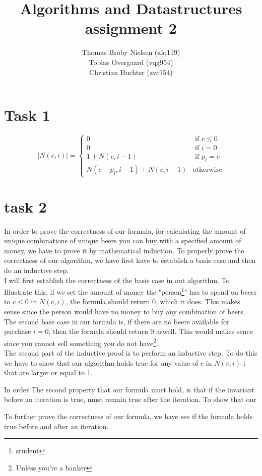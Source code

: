 \documentclass[12pt]{article}
\title{Algorithms and Datastructures assignment 2}
\author{Thomas Broby Nielsen (xlq119)\\ Tobias Overgaard (vqg954)\\ Christian Buchter (zvc154)}
\begin{document}
\maketitle

\tableofcontents

\pagebreak
\section{Task 1}
$$
|N(c,i)| = \left\{ \begin{array}{rl}
0 &\mbox{ if $c \leq 0$} \\
0 &\mbox{ if $i=0$} \\
1+N(c,i-1) &\mbox{ if $p_i=c$}\\
N(c-p_i,i-1)+N(c,i-1) &\mbox{otherwise}
\end{array} \right.
$$

\section{task 2}
In order to prove the correctness of our formula, for calculating the amount of unique combinations of unique beers you can buy with a specified amount of money, we have to prove it by mathematical induction. To properly prove the correctness of our algorithm, we have first have to establish a basis case and then do an inductive step.
\\
I will first establish the correctness of the basis case in out algorithm. To Illustrate this, if we set the amount of money the "person\footnote{student}" has to spend on beers to $c \leq 0$ in $N(c,i)$, the formula should return 0, which it does. This makes sense since the person would have no money to buy any combination of beers. The second base case in our formula is, if there are no beers available for purchase $i=0$, then the formela should return 0 aswell. This would makes sence since you cannot sell something you do not have\footnote{Unless you're a banker}.
\\
The second part of the inductive proof is to perform an inductive step. To do this we have to show that our algorithm holds true for any value of c in $N(c,i)$ i that are larger or equal to 1.



In order The second property that our formula must hold, is that if the invariant before an iteration is true, must remain true after the iteration. To show that our 

To further prove the correctness of our formula, we have see if the formula holds true before and after an iteration. 
\newpage
\end{document}
